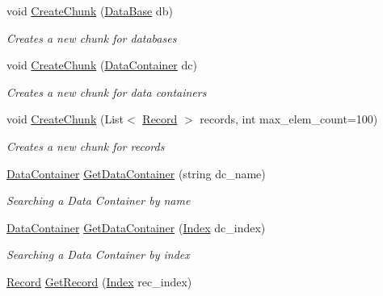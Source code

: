 \begin{DoxyCompactItemize}
\item 
void \hyperlink{class_dwarf_d_b_1_1_chunk_manager_1_1_chunk_manager_a88c934e118ea03cdc8e99290f65a967a}{Create\+Chunk} (\hyperlink{class_dwarf_d_b_1_1_data_structures_1_1_data_base}{Data\+Base} db)
\begin{DoxyCompactList}\small\item\em Creates a new chunk for databases \end{DoxyCompactList}\item 
void \hyperlink{class_dwarf_d_b_1_1_chunk_manager_1_1_chunk_manager_a9cc2ba0706faf8e49af4a098f0ffffd5}{Create\+Chunk} (\hyperlink{class_dwarf_d_b_1_1_data_structures_1_1_data_container}{Data\+Container} dc)
\begin{DoxyCompactList}\small\item\em Creates a new chunk for data containers \end{DoxyCompactList}\item 
void \hyperlink{class_dwarf_d_b_1_1_chunk_manager_1_1_chunk_manager_a96ab6bd09f2a5b1d05fe92163e40b512}{Create\+Chunk} (List$<$ \hyperlink{class_dwarf_d_b_1_1_data_structures_1_1_record}{Record} $>$ records, int max\+\_\+elem\+\_\+count=100)
\begin{DoxyCompactList}\small\item\em Creates a new chunk for records \end{DoxyCompactList}\item 
\hyperlink{class_dwarf_d_b_1_1_data_structures_1_1_data_container}{Data\+Container} \hyperlink{class_dwarf_d_b_1_1_chunk_manager_1_1_chunk_manager_ae7fb3a97ffa480b023785dfca48e18ec}{Get\+Data\+Container} (string dc\+\_\+name)
\begin{DoxyCompactList}\small\item\em Searching a Data Container by name \end{DoxyCompactList}\item 
\hyperlink{class_dwarf_d_b_1_1_data_structures_1_1_data_container}{Data\+Container} \hyperlink{class_dwarf_d_b_1_1_chunk_manager_1_1_chunk_manager_ac7362867e884632398fb26cf4f0ef9b5}{Get\+Data\+Container} (\hyperlink{class_dwarf_d_b_1_1_data_structures_1_1_index}{Index} dc\+\_\+index)
\begin{DoxyCompactList}\small\item\em Searching a Data Container by index \end{DoxyCompactList}\item 
\hyperlink{class_dwarf_d_b_1_1_data_structures_1_1_record}{Record} \hyperlink{class_dwarf_d_b_1_1_chunk_manager_1_1_chunk_manager_a188cdde83cc43cef01aabe0fd998f16f}{Get\+Record} (\hyperlink{class_dwarf_d_b_1_1_data_structures_1_1_index}{Index} rec\+\_\+index)

\end{DoxyCompactItemize}
